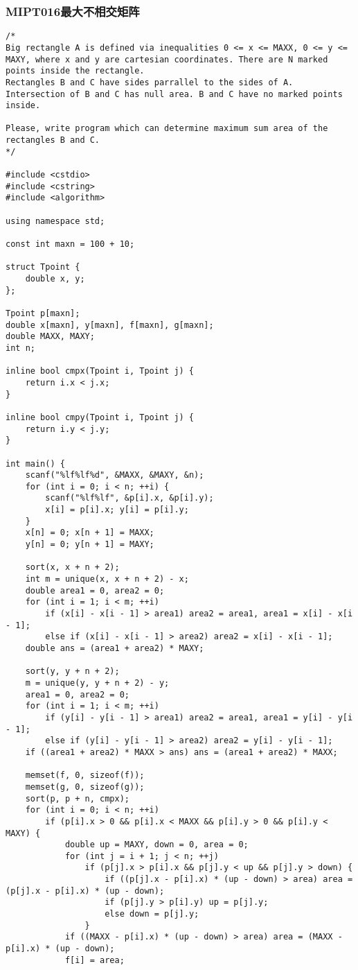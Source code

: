 \subsubsection{MIPT016最大不相交矩阵}
\begin{verbatim}
/*
Big rectangle A is defined via inequalities 0 <= x <= MAXX, 0 <= y <= MAXY, where x and y are cartesian coordinates. There are N marked points inside the rectangle.
Rectangles B and C have sides parrallel to the sides of A. Intersection of B and C has null area. B and C have no marked points inside.

Please, write program which can determine maximum sum area of the rectangles B and C.
*/

#include <cstdio>
#include <cstring>
#include <algorithm>

using namespace std;

const int maxn = 100 + 10;

struct Tpoint {
    double x, y;
};

Tpoint p[maxn];
double x[maxn], y[maxn], f[maxn], g[maxn];
double MAXX, MAXY;
int n;

inline bool cmpx(Tpoint i, Tpoint j) {
    return i.x < j.x;
}

inline bool cmpy(Tpoint i, Tpoint j) {
    return i.y < j.y;
}

int main() {
    scanf("%lf%lf%d", &MAXX, &MAXY, &n);
    for (int i = 0; i < n; ++i) {
        scanf("%lf%lf", &p[i].x, &p[i].y);
        x[i] = p[i].x; y[i] = p[i].y;
    }
    x[n] = 0; x[n + 1] = MAXX;
    y[n] = 0; y[n + 1] = MAXY;

    sort(x, x + n + 2);
    int m = unique(x, x + n + 2) - x;
    double area1 = 0, area2 = 0;
    for (int i = 1; i < m; ++i)
        if (x[i] - x[i - 1] > area1) area2 = area1, area1 = x[i] - x[i - 1];
        else if (x[i] - x[i - 1] > area2) area2 = x[i] - x[i - 1];
    double ans = (area1 + area2) * MAXY;

    sort(y, y + n + 2);
    m = unique(y, y + n + 2) - y;
    area1 = 0, area2 = 0;
    for (int i = 1; i < m; ++i)
        if (y[i] - y[i - 1] > area1) area2 = area1, area1 = y[i] - y[i - 1];
        else if (y[i] - y[i - 1] > area2) area2 = y[i] - y[i - 1];
    if ((area1 + area2) * MAXX > ans) ans = (area1 + area2) * MAXX;

    memset(f, 0, sizeof(f));
    memset(g, 0, sizeof(g));
    sort(p, p + n, cmpx);
    for (int i = 0; i < n; ++i)
        if (p[i].x > 0 && p[i].x < MAXX && p[i].y > 0 && p[i].y < MAXY) {
            double up = MAXY, down = 0, area = 0;
            for (int j = i + 1; j < n; ++j)
                if (p[j].x > p[i].x && p[j].y < up && p[j].y > down) {
                    if ((p[j].x - p[i].x) * (up - down) > area) area = (p[j].x - p[i].x) * (up - down);
                    if (p[j].y > p[i].y) up = p[j].y;
                    else down = p[j].y;
                }
            if ((MAXX - p[i].x) * (up - down) > area) area = (MAXX - p[i].x) * (up - down);
            f[i] = area;


\end{verbatim}
